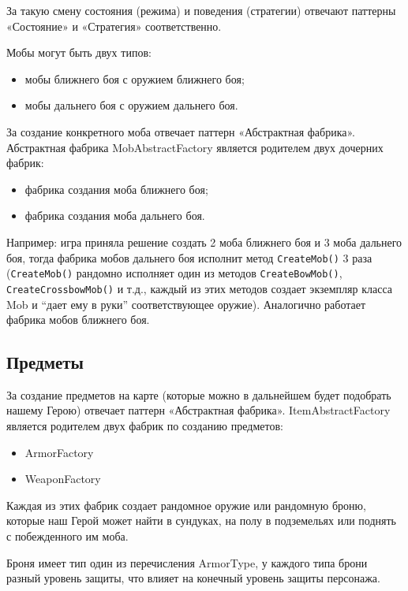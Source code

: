 \documentclass[a4paper,10pt]{article}
\begin{document}
За такую смену состояния (режима) и поведения (стратегии) отвечают паттерны «Состояние» и «Стратегия» соответственно.

Мобы могут быть двух типов:

\begin{itemize}
    \item мобы ближнего боя с оружием ближнего боя;
    \item мобы дальнего боя с оружием дальнего боя.
\end{itemize}

За создание конкретного моба отвечает паттерн «Абстрактная фабрика». Абстрактная фабрика MobAbstractFactory является родителем двух дочерних фабрик:


\begin{itemize}
    \item фабрика создания моба ближнего боя;
    \item фабрика создания моба дальнего боя.
\end{itemize}

Например: игра приняла решение создать 2 моба ближнего боя и 3 моба дальнего боя, тогда фабрика мобов дальнего боя исполнит метод \texttt{CreateMob()} 3 раза (\texttt{CreateMob()} рандомно исполняет один из методов \texttt{CreateBowMob()}, \texttt{CreateCrossbowMob()} и т.д., каждый из этих методов создает экземпляр класса Mob и “дает ему в руки” соответствующее оружие). Аналогично работает фабрика мобов ближнего боя. 


\subsection*{Предметы}

За создание предметов на карте (которые можно в дальнейшем будет подобрать нашему Герою) отвечает паттерн «Абстрактная фабрика». ItemAbstractFactory является родителем двух фабрик по созданию предметов:


\begin{itemize}
    \item ArmorFactory
    \item WeaponFactory
\end{itemize}

Каждая из этих фабрик создает рандомное оружие или рандомную броню, которые наш Герой может найти в сундуках, на полу в подземельях или поднять с побежденного им моба. 

Броня имеет тип один из перечисления ArmorType, у каждого типа брони разный уровень защиты, что влияет на конечный уровень защиты персонажа. 
\end{document}
